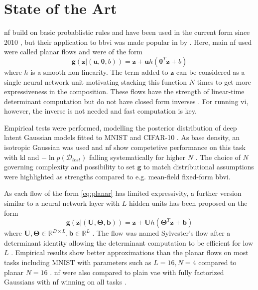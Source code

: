 \documentclass[12pt,fleqn,twocolumn]{article}
\newcommand{\RR}{\ensuremath{\mathbb R}}
\begin{document}
\section*{State of the Art}%
\acrshort{nf} build on basic probablistic rules and have been used in the current form since 2010 \cite{koby2021nf}, but their application to \acrshort{bbvi} was made popular in \citeyear{JimenezRezende2015VariationalIW} by \textcite{JimenezRezende2015VariationalIW}.
Here, main \acrshort{nf} used were called planar flows and were of the form
\begin{equation}\label{eq:planar}
    \mathbf g(\mathbf z | (\mathbf u, \bm \theta, b)) = \mathbf z + \mathbf u h \left(\bm \theta ^T \mathbf z + b\right)
\end{equation}
where $h$ is a smooth non-linearity.
The term added to $\mathbf z$ can be considered as a single neural network unit motivating stacking this function $N$ times to get more expressiveness in the composition.
These flows have the strength of linear-time determinant computation but do not have closed form inverses \cite[Chap. 4.1]{JimenezRezende2015VariationalIW}.
For running \acrshort{vi}, however, the inverse is not needed and fast computation is key.

Empirical tests were performed, modelling the posterior distribution of deep latent Gaussian models fitted to MNIST and CIFAR-10 \cite[Chap. 6.2]{JimenezRezende2015VariationalIW}.
As base density, an isotropic Gaussian was used \cite[Chap. 6.1]{JimenezRezende2015VariationalIW} and \acrshort{nf} show competetive performance on this task with \acrshort{kl} and $-\ln p(\mathcal D_{test})$ falling systematically for higher $N$ \cite[Fig. 4, Tab. 2 and 3]{JimenezRezende2015VariationalIW}.
The choice of $N$ governing complexity and possibility to set $\mathbf g$ to match distributional assumptions were highlighted as strengths compared to e.g. mean-field fixed-form \acrshort{bbvi}.

As each flow of the form \eqref{eq:planar} has limited expressivity, a further version similar to a neural network layer with $L$ hidden units has been proposed on the form
\begin{equation}
    \mathbf g(\mathbf z | (\mathbf U, \bm \Theta, \mathbf b)) = \mathbf z + \mathbf U h \left(\bm \Theta ^T \mathbf z + \mathbf b\right)
\end{equation}
where $\mathbf U, \bm \Theta \in \RR^{D\times L}, \mathbf b\in \RR^L$ \cite[Chap. 3]{Berg2018SylvesterNF}.
The flow was named Sylvester's flow after a determinant identity allowing the determinant computation to be efficient for low $L$ \cite[Theorem 1]{Berg2018SylvesterNF}.
Empirical results show better approximations than the planar flows on most tasks including MNIST with parameters such as $L=16, N=4$ compared to planar $N=16$ \cite[Tab. 3]{Berg2018SylvesterNF}.
\acrshort{nf} were also compared to plain \acrfull{vae} with fully factorized Gaussians with \acrshort{nf} winning on all tasks \cite[Tab. 1, Tab.2]{Berg2018SylvesterNF}.
\end{document}
